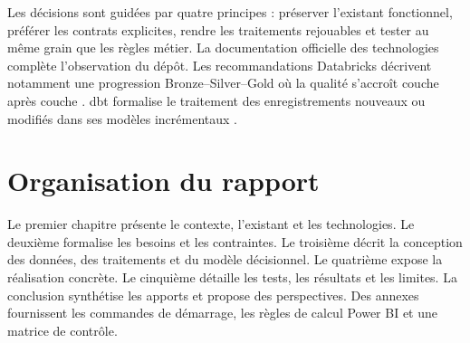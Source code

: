 Les décisions sont guidées par quatre principes : préserver l'existant fonctionnel, préférer les contrats explicites, rendre les traitements rejouables et tester au même grain que les règles métier. La documentation officielle des technologies complète l'observation du dépôt. Les recommandations Databricks décrivent notamment une progression Bronze--Silver--Gold où la qualité s'accroît couche après couche \cite{databricks-medallion}. dbt formalise le traitement des enregistrements nouveaux ou modifiés dans ses modèles incrémentaux \cite{dbt-incremental}.

\section*{Organisation du rapport}
Le premier chapitre présente le contexte, l'existant et les technologies. Le deuxième formalise les besoins et les contraintes. Le troisième décrit la conception des données, des traitements et du modèle décisionnel. Le quatrième expose la réalisation concrète. Le cinquième détaille les tests, les résultats et les limites. La conclusion synthétise les apports et propose des perspectives. Des annexes fournissent les commandes de démarrage, les règles de calcul Power BI et une matrice de contrôle.

